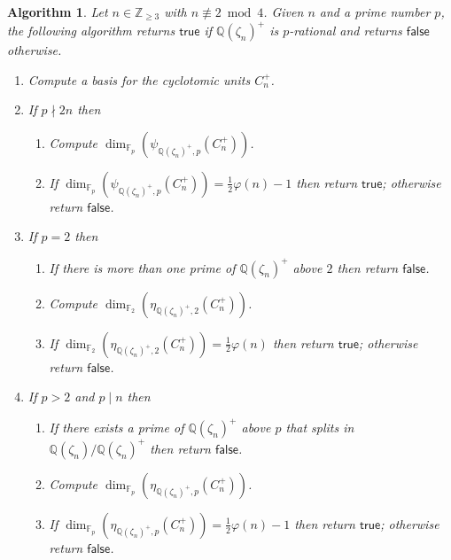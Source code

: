 \documentclass[12pt, a4paper, usenames]{amsart}
\newcommand{\Z}{\mathbb{Z}}
\newcommand{\Q}{\mathbb{Q}}
\theoremstyle{plain}
\newtheorem{algorithm}[theorem]{Algorithm}
\theoremstyle{remark}
\theoremstyle{definition}
\begin{document}
\begin{algorithm}\label{alg:p-rat-cyclo}
Let $n \in \Z_{\geq 3}$ with $n \not \equiv 2 \bmod 4$.
Given $n$ and a prime number $p$, the following algorithm returns 
\ensuremath{\mathsf{true}} if $\Q(\zeta_{n})^{+}$ is $p$-rational 
and returns \ensuremath{\mathsf{false}} otherwise. 
\renewcommand{\labelenumi}{(\arabic{enumi})}
\begin{enumerate}
\item Compute a basis for the cyclotomic units $C_{n}^{+}$.
\item\label{step:p-nmid-n} If $p \nmid 2n$ then
\begin{enumerate}
    \item Compute $\dim_{\mathbb{F}_{p}}(\psi_{\Q(\zeta_{n})^{+},p}(C_{n}^{+}))$. 
    \item If $\dim_{\mathbb{F}_{p}}(\psi_{\Q(\zeta_{n})^{+},p}(C_{n}^{+}))=\frac{1}{2}\varphi(n)-1$ 
    then return \ensuremath{\mathsf{true}};
    otherwise return \ensuremath{\mathsf{false}}.
\end{enumerate}
\item\label{step:p=2}  If $p=2$ then
\begin{enumerate}
    \item If there is more than one prime of $\Q(\zeta_{n})^{+}$ above $2$
    then return \ensuremath{\mathsf{false}}.
    \item Compute $\dim_{\mathbb{F}_{2}}(\eta_{\Q(\zeta_{n})^{+},2}(C_{n}^{+}))$. 
    \item If $\dim_{\mathbb{F}_{2}}(\eta_{\Q(\zeta_{n})^{+},2}(C_{n}^{+}))=\frac{1}{2}\varphi(n)$ 
    then return \ensuremath{\mathsf{true}};
    otherwise return \ensuremath{\mathsf{false}}.
\end{enumerate}
\item\label{step:p-odd-mid-n}  If $p>2$ and $p \mid n$ then
\begin{enumerate}
    \item If there exists a prime of $\Q(\zeta_{n})^{+}$ above $p$ that splits in $\Q(\zeta_{n})/\Q(\zeta_{n})^{+}$ then return \ensuremath{\mathsf{false}}.
    \item Compute $\dim_{\mathbb{F}_{p}}(\eta_{\Q(\zeta_{n})^{+},p}(C_{n}^{+}))$. 
    \item If $\dim_{\mathbb{F}_{p}}(\eta_{\Q(\zeta_{n})^{+},p}(C_{n}^{+}))=\frac{1}{2}\varphi(n)-1$ 
    then return \ensuremath{\mathsf{true}};
    otherwise return \ensuremath{\mathsf{false}}.
\end{enumerate}
\end{enumerate}
\end{algorithm}
\end{document}
